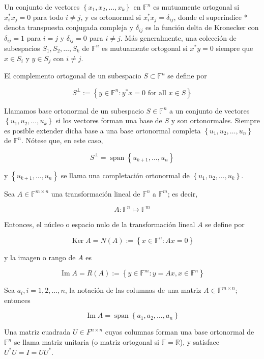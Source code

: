 Un conjunto de vectores $\left\{x_{1}, x_{2}, \ldots, x_{k}\right\}$ en $\mathbb{F}^{n}$ es mutuamente ortogonal si $x_{i}^{*} x_{j}=0$ para todo $i \neq j$, y es ortonormal si $x_{i}^{*} x_{j}=\delta_{i j}$, donde el superíndice * denota transpuesta conjugada compleja y $\delta_{i j}$ es la función delta de Kronecker con $\delta_{i j}=1$ para $i=j$ y $\delta_{i j}=0$ para $i \neq j$. Más generalmente, una colección de subespacios $S_{1}, S_{2}, \ldots, S_{k}$ de $\mathbb{F}^{n}$ es mutuamente ortogonal si $x^{*} y=0$ siempre que $x \in S_{i}$ y $y \in S_{j}$ con $i \neq j$.

El complemento ortogonal de un subespacio $S \subset \mathbb{F}^{n}$ se define por

$$
S^{\perp}:=\left\{y \in \mathbb{F}^{n}: y^{*} x=0 \text { for all } x \in S\right\}
$$

Llamamos base ortonormal de un subespacio $S \in \mathbb{F}^{n}$ a un conjunto de vectores $\left\{u_{1}, u_{2}, \ldots, u_{k}\right\}$ si los vectores forman una base de $S$ y son ortonormales. Siempre es posible extender dicha base a una base ortonormal completa $\left\{u_{1}, u_{2}, \ldots, u_{n}\right\}$ de $\mathbb{F}^{n}$. Nótese que, en este caso,

$$
S^{\perp}=\operatorname{span}\left\{u_{k+1}, \ldots, u_{n}\right\}
$$

y $\left\{u_{k+1}, \ldots, u_{n}\right\}$ se llama una completación ortonormal de $\left\{u_{1}, u_{2}, \ldots, u_{k}\right\}$.

Sea $A \in \mathbb{F}^{m \times n}$ una transformación lineal de $\mathbb{F}^{n}$ a $\mathbb{F}^{m}$; es decir,

$$
A: \mathbb{F}^{n} \longmapsto \mathbb{F}^{m}
$$

Entonces, el núcleo o espacio nulo de la transformación lineal $A$ se define por

$$
\operatorname{Ker} A=N(A):=\left\{x \in \mathbb{F}^{n}: A x=0\right\}
$$

y la imagen o rango de $A$ es

$$
\operatorname{Im} A=R(A):=\left\{y \in \mathbb{F}^{m}: y=A x, x \in \mathbb{F}^{n}\right\}
$$

Sea $a_{i}, i=1,2, \ldots, n$, la notación de las columnas de una matriz $A \in \mathbb{F}^{m \times n}$; entonces

$$
\operatorname{Im} A=\operatorname{span}\left\{a_{1}, a_{2}, \ldots, a_{n}\right\}
$$

Una matriz cuadrada $U \in F^{n \times n}$ cuyas columnas forman una base ortonormal de $\mathbb{F}^{n}$ se llama matriz unitaria (o matriz ortogonal si $\mathbb{F}=\mathbb{R}$), y satisface $U^{*} U=I=U U^{*}$.

